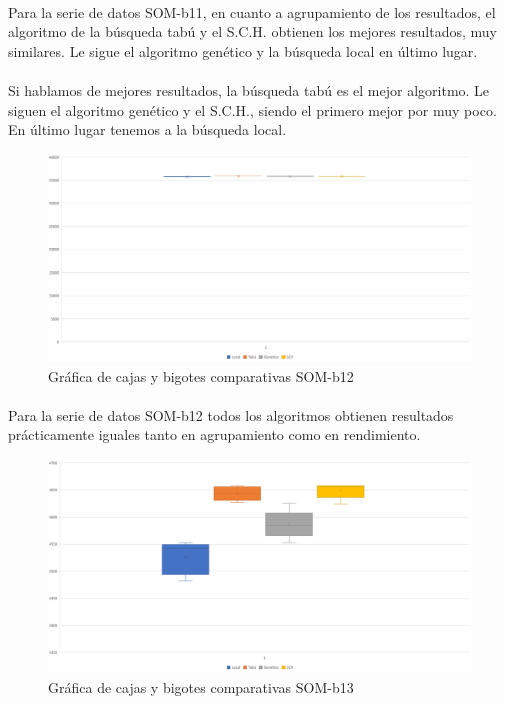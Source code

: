 	\paragraph{}Para la serie de datos SOM-b11, en cuanto a agrupamiento de los resultados, el algoritmo de la búsqueda tabú y el S.C.H. obtienen los mejores resultados, muy similares. Le sigue el algoritmo genético y la búsqueda local en último lugar.
	
	\paragraph{}Si hablamos de mejores resultados, la búsqueda tabú es el mejor algoritmo. Le siguen el algoritmo genético y el S.C.H., siendo el primero mejor por muy poco. En último lugar tenemos a la búsqueda local.

	\begin{figure}[H]
		\centering
		\includegraphics[scale=0.3]{img/finalSOM2.png}
		\caption{Gráfica de cajas y bigotes comparativas SOM-b12}
		\label{SOM-b12_final}
	\end{figure}

	\paragraph{}Para la serie de datos SOM-b12 todos los algoritmos obtienen resultados prácticamente iguales tanto en agrupamiento como en rendimiento.

	\begin{figure}[H]
		\centering
		\includegraphics[scale=0.3]{img/finalSOM3.png}
		\caption{Gráfica de cajas y bigotes comparativas SOM-b13}
		\label{SOM-b13_final}
	\end{figure}

